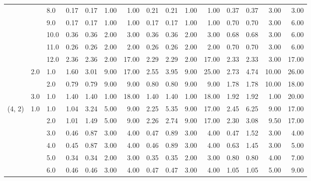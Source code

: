 \begin{tabular}{lllrrrrrrrrrrrr}
       &     & 8.0  &       0.17 &      0.17 & 1.00 &   1.00 &       0.21 &      0.21 &  1.00 &   1.00 &       0.37 &      0.37 &  3.00 &   3.00 \\
       &     & 9.0  &       0.17 &      0.17 & 1.00 &   1.00 &       0.17 &      0.17 &  1.00 &   1.00 &       0.70 &      0.70 &  3.00 &   6.00 \\
       &     & 10.0 &       0.36 &      0.36 & 2.00 &   3.00 &       0.36 &      0.36 &  2.00 &   3.00 &       0.68 &      0.68 &  3.00 &   6.00 \\
       &     & 11.0 &       0.26 &      0.26 & 2.00 &   2.00 &       0.26 &      0.26 &  2.00 &   2.00 &       0.70 &      0.70 &  3.00 &   6.00 \\
       &     & 12.0 &       2.36 &      2.36 & 2.00 &  17.00 &       2.29 &      2.29 &  2.00 &  17.00 &       2.33 &      2.33 &  3.00 &  17.00 \\
       & 2.0 & 1.0  &       1.60 &      3.01 & 9.00 &  17.00 &       2.55 &      3.95 &  9.00 &  25.00 &       2.73 &      4.74 & 10.00 &  26.00 \\
       &     & 2.0  &       0.79 &      0.79 & 9.00 &   9.00 &       0.80 &      0.80 &  9.00 &   9.00 &       1.78 &      1.78 & 10.00 &  18.00 \\
       & 3.0 & 1.0  &       1.40 &      1.40 & 1.00 &  18.00 &       1.40 &      1.40 &  1.00 &  18.00 &       1.92 &      1.92 &  1.00 &  20.00 \\
(4, 2) & 1.0 & 1.0  &       1.04 &      3.24 & 5.00 &   9.00 &       2.25 &      5.35 &  9.00 &  17.00 &       2.45 &      6.25 &  9.00 &  17.00 \\
       &     & 2.0  &       1.01 &      1.49 & 5.00 &   9.00 &       2.26 &      2.74 &  9.00 &  17.00 &       2.30 &      3.08 &  9.50 &  17.00 \\
       &     & 3.0  &       0.46 &      0.87 & 3.00 &   4.00 &       0.47 &      0.89 &  3.00 &   4.00 &       0.47 &      1.52 &  3.00 &   4.00 \\
       &     & 4.0  &       0.45 &      0.87 & 3.00 &   4.00 &       0.46 &      0.89 &  3.00 &   4.00 &       0.63 &      1.45 &  3.00 &   5.00 \\
       &     & 5.0  &       0.34 &      0.34 & 2.00 &   3.00 &       0.35 &      0.35 &  2.00 &   3.00 &       0.80 &      0.80 &  4.00 &   7.00 \\
       &     & 6.0  &       0.46 &      0.46 & 3.00 &   4.00 &       0.47 &      0.47 &  3.00 &   4.00 &       1.05 &      1.05 &  5.00 &   9.00 \\

\end{tabular}
